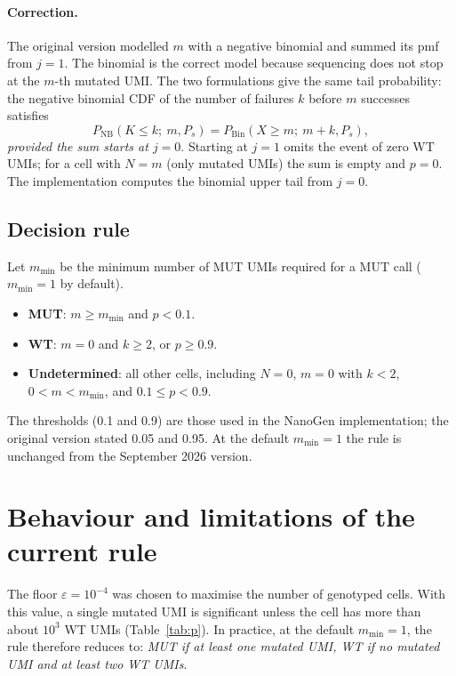 \documentclass[11pt]{article}
\begin{document}
\paragraph{Correction.} The original version modelled $m$ with a negative binomial and summed its pmf from $j=1$. The binomial is the correct model because sequencing does not stop at the $m$-th mutated UMI. The two formulations give the same tail probability: the negative binomial CDF of the number of failures $k$ before $m$ successes satisfies
\begin{equation}
P_{\mathrm{NB}}(K \leq k;\ m, P_s) = P_{\mathrm{Bin}}(X \geq m;\ m+k, P_s),
\end{equation}
\emph{provided the sum starts at $j=0$}. Starting at $j=1$ omits the event of zero WT UMIs; for a cell with $N=m$ (only mutated UMIs) the sum is empty and $p=0$. The implementation computes the binomial upper tail from $j=0$.

\subsection*{Decision rule}
Let $m_{\min}$ be the minimum number of MUT UMIs required for a MUT call ($m_{\min}=1$ by default).
\begin{itemize}
\item \textbf{MUT}: $m \geq m_{\min}$ and $p < 0.1$.
\item \textbf{WT}: $m = 0$ and $k \geq 2$, or $p \geq 0.9$.
\item \textbf{Undetermined}: all other cells, including $N=0$, $m=0$ with $k<2$, $0 < m < m_{\min}$, and $0.1 \leq p < 0.9$.
\end{itemize}
The thresholds (0.1 and 0.9) are those used in the NanoGen implementation; the original version stated 0.05 and 0.95. At the default $m_{\min}=1$ the rule is unchanged from the September 2026 version.

\section{Behaviour and limitations of the current rule}

The floor $\varepsilon=10^{-4}$ was chosen to maximise the number of genotyped cells. With this value, a single mutated UMI is significant unless the cell has more than about $10^3$ WT UMIs (Table~\ref{tab:p}). In practice, at the default $m_{\min}=1$, the rule therefore reduces to: \emph{MUT if at least one mutated UMI, WT if no mutated UMI and at least two WT UMIs}.
\end{document}
